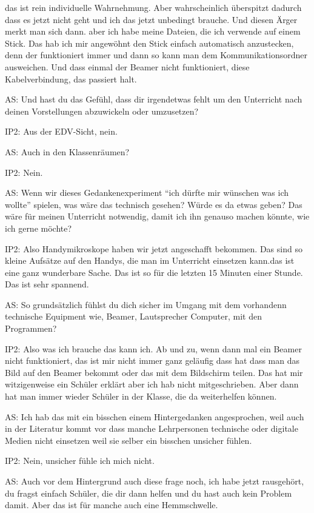\documentclass[fontsize=11pt,paper=a4]{scrbook}
\begin{document}
{\begin{itemize*}
das ist rein individuelle Wahrnehmung.
Aber wahrscheinlich überspitzt dadurch
dass es jetzt nicht geht und ich das jetzt
unbedingt brauche. Und diesen Ärger merkt man sich dann.
aber ich habe meine Dateien, die ich verwende auf einem Stick. Das hab ich mir angewöhnt
den Stick einfach automatisch
anzustecken, denn der funktioniert
immer und dann so kann man dem
Kommunikationsordner ausweichen. Und dass einmal der Beamer nicht funktioniert, diese Kabelverbindung, das passiert halt.
\item[AS:] Und hast du das Gefühl, dass dir
irgendetwas fehlt um den Unterricht nach
deinen Vorstellungen abzuwickeln oder
umzusetzen?
\item[IP2:] Aus der EDV-Sicht, nein.
\item[AS:]Auch in den Klassenräumen?
\item[IP2:]Nein.
\item[AS:] Wenn wir dieses Gedankenexperiment "`ich dürfte
mir wünschen was ich wollte"' spielen,  was wäre das technisch gesehen?
Würde es da etwas geben? Das wäre für meinen Unterricht notwendig, damit ich ihn genauso machen könnte, wie ich gerne möchte?
\item[IP2:] Also Handymikroskope haben wir jetzt angeschafft bekommen. Das sind so kleine Aufsätze auf den Handys, die man im Unterricht einsetzen kann.das ist eine ganz wunderbare Sache. Das ist so für die letzten 15 Minuten einer Stunde. Das ist sehr spannend.
\item[AS:] So 
grundsätzlich fühlst du dich sicher im Umgang mit dem vorhandenn technische Equipment wie, Beamer, Lautsprecher
Computer, mit den Programmen?
\item[IP2:] Also was ich brauche das kann ich. Ab und zu, wenn dann mal ein Beamer nicht funktioniert, das ist mir nicht immer ganz
geläufig dass hat dass man das Bild auf
den Beamer bekommt oder das mit dem Bildschirm teilen. Das hat mir witzigenweise ein Schüler erklärt aber ich
hab nicht mitgeschrieben. Aber dann hat man immer wieder Schüler in der Klasse, die da weiterhelfen können.
\item[AS:] Ich hab das mit ein bisschen einem Hintergedanken
angesprochen, weil auch in der Literatur
kommt vor dass manche Lehrpersonen technische oder
digitale Medien nicht einsetzen weil sie
selber ein bisschen unsicher fühlen.
\item[IP2:] Nein, unsicher fühle ich mich nicht. 
\item[AS:] Auch vor dem Hintergrund auch diese frage noch, ich habe jetzt rausgehört, du fragst einfach Schüler, die dir dann helfen und du hast auch kein Problem damit. Aber das ist für manche auch eine Hemmschwelle.

\end{itemize*}}
\end{document}
